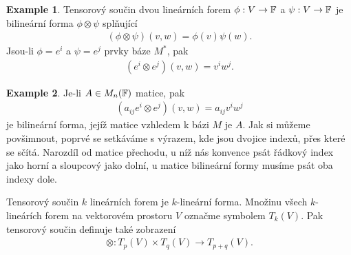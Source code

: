 \documentclass[a4paper,11pt]{article}
\theoremstyle{theorem}
\theoremstyle{remark}
\theoremstyle{definition}
\newtheorem*{example}{Example}
\begin{document}
	\begin{example}
		Tensorový součin dvou lineárních forem $\phi : V \to {\mathbb F}$ a $\psi : V \to {\mathbb F}$ je bilineární forma $\phi \otimes \psi$ splňující
		\begin{align*}
			(\phi \otimes \psi)(v,w) = \phi(v) \psi(w).
		\end{align*}
		Jsou-li $\phi = e^i$ a $\psi = e^j$ prvky báze $M^*$, pak
		\begin{align*}
			(e^i \otimes e^j)(v,w) = v^i w^j.
		\end{align*}
	\end{example}
	\begin{example}
		Je-li $A \in M_n({\mathbb F})$ matice, pak
		\begin{align*}
			(a_{ij}e^i \otimes e^j)(v,w) = a_{ij} v^i w^j
		\end{align*}
		je bilineární forma, jejíž matice vzhledem k bázi $M$ je $A$. Jak si můžeme povšimnout, poprvé se setkáváme s výrazem, kde jsou dvojice indexů, přes které se sčítá. Narozdíl od matice přechodu, u níž nás konvence  psát řádkový index jako horní a sloupcový jako dolní, u matice bilineární formy musíme psát oba indexy dole.
	\end{example}
	
	Tensorový součin $k$ lineárních forem je $k$-lineární forma. Množinu všech $k$-lineárích forem na vektorovém prostoru $V$ označme symbolem $T_k(V)$. Pak tensorový součin definuje také zobrazení
	\begin{align*}
		\otimes : T_p(V) \times T_q(V) \to T_{p+q}(V).
	\end{align*}
	
\end{document}
